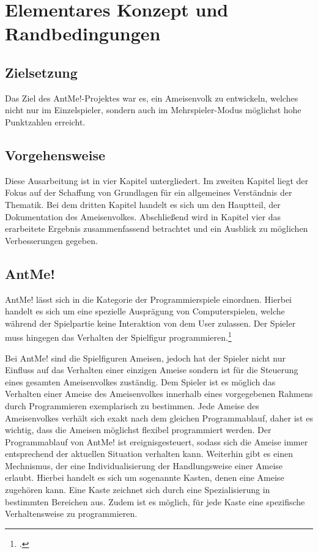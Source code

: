 \section{Elementares Konzept und Randbedingungen}
\label{concept}

\subsection{Zielsetzung}
Das Ziel des AntMe!-Projektes war es, ein Ameisenvolk zu entwickeln, welches nicht nur im Einzelspieler, sondern auch im Mehrspieler-Modus möglichst hohe Punktzahlen erreicht.

\subsection{Vorgehensweise}
Diese Ausarbeitung ist in vier Kapitel untergliedert. Im zweiten Kapitel liegt der Fokus auf der Schaffung von Grundlagen für ein allgemeines Verständnis der Thematik. Bei dem dritten Kapitel handelt es sich um den Hauptteil, der Dokumentation des Ameisenvolkes. Abschließend wird in Kapitel vier das erarbeitete Ergebnis zusammenfassend betrachtet und ein Ausblick zu möglichen Verbesserungen gegeben.

\subsection{AntMe!}
AntMe! lässt sich in die Kategorie der Programmierspiele einordnen. Hierbei handelt es sich um eine spezielle Ausprägung von Computerspielen, welche während der Spielpartie keine Interaktion von dem User zulassen. Der Spieler muss hingegen das Verhalten der Spielfigur programmieren.\footcite[Vgl.][]{Wikipedia}

Bei AntMe! sind die Spielfiguren Ameisen, jedoch hat der Spieler nicht nur Einfluss auf das Verhalten einer einzigen Ameise sondern ist für die Steuerung eines gesamten Ameisenvolkes zuständig. Dem Spieler ist es möglich das Verhalten einer Ameise des Ameisenvolkes innerhalb eines vorgegebenen Rahmens durch Programmieren exemplarisch zu bestimmen. Jede Ameise des Ameisenvolkes verhält sich exakt nach dem gleichen Programmablauf, daher ist es wichtig, dass die Ameisen möglichst flexibel programmiert werden. Der Programmablauf von AntMe! ist ereignisgesteuert, sodass sich die Ameise immer entsprechend der aktuellen Situation verhalten kann. Weiterhin gibt es einen Mechnismus, der eine Individualisierung der Handlungsweise einer Ameise  erlaubt. Hierbei handelt es sich um sogenannte Kasten, denen eine Ameise zugehören kann. Eine Kaste zeichnet sich durch eine Spezialisierung in bestimmten Bereichen aus. Zudem ist es möglich, für jede Kaste eine spezifische Verhaltensweise zu programmieren.


